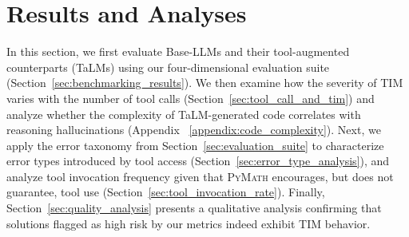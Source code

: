 \documentclass[11pt]{article}
\def \dataset{\textsc{PyMath}\xspace}
\def \task{\textsc{TIM}\xspace}
\newcommand{\pouya}[1]{{\color{violet}Pouya: #1}}
\begin{document}
\section{Results and Analyses}

In this section, we first evaluate Base-LLMs and their tool-augmented counterparts (TaLMs) using our four-dimensional evaluation suite (Section~\ref{sec:benchmarking_results}). We then examine how the severity of \task{} varies with the number of tool calls (Section~\ref{sec:tool_call_and_tim}) and analyze whether the complexity of TaLM-generated code correlates with reasoning hallucinations (Appendix ~\ref{appendix:code_complexity}).
Next, we apply the error taxonomy from Section~\ref{sec:evaluation_suite} to characterize error types introduced by tool access (Section~\ref{sec:error_type_analysis}), and analyze tool invocation frequency given that \dataset{} encourages, but does not guarantee, tool use (Section~\ref{sec:tool_invocation_rate}).
Finally, Section~\ref{sec:quality_analysis} presents a qualitative analysis confirming that solutions flagged as high risk by our metrics indeed exhibit \task{} behavior.
\end{document}
